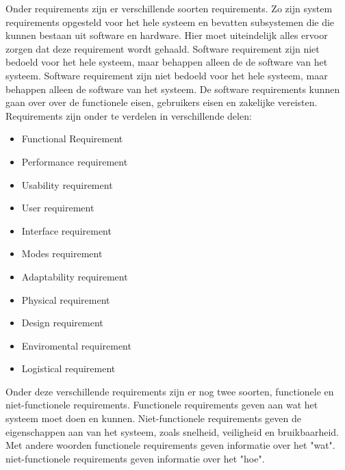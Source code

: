 \documentclass{article}%
\begin{document}
Onder requirements zijn er verschillende soorten requirements. Zo zijn system requirements opgesteld voor het hele systeem en bevatten subsystemen die die kunnen bestaan uit software en hardware. Hier moet uiteindelijk alles ervoor zorgen dat deze requirement wordt gehaald. Software requirement zijn niet bedoeld voor het hele systeem, maar behappen alleen de de software van het systeem. Software requirement zijn niet bedoeld voor het hele systeem, maar behappen alleen de software van het systeem. De software requirements kunnen gaan over over de functionele eisen, gebruikers eisen en zakelijke vereisten.
Requirements zijn onder te verdelen in verschillende delen: 
\begin{multicols}{2}
\begin{itemize}
\item Functional Requirement
\item Performance requirement
\item Usability requirement
\item User requirement
\item Interface requirement
\item Modes requirement
\item Adaptability requirement
\item Physical requirement
\item Design requirement
\item Enviromental requirement
\item Logistical requirement
\end{itemize}
\end{multicols}

Onder deze verschillende requirements zijn er nog twee soorten, functionele en niet-functionele requirements. 
Functionele requirements geven aan wat het systeem moet doen en kunnen. Niet-functionele requirements geven de eigenschappen aan van het systeem, zoals snelheid, veiligheid en bruikbaarheid. Met andere woorden functionele requirements geven informatie over het "wat". niet-functionele requirements geven informatie over het "hoe".
\end{document}
